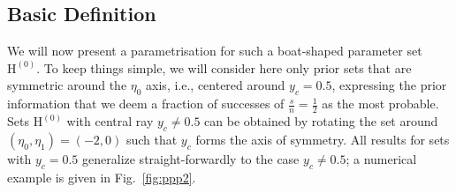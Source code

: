 \documentclass[runningheads,a4paper]{llncs}
\newcommand{\uz}{^{(0)}} %
\def\EZ{\mathrm{H}\uz}
\begin{document}
\subsection{Basic Definition}
\label{sec:basicdefboat}

We will now present a parametrisation for such a boat-shaped parameter set $\EZ$.
To keep things simple, we will consider here only prior sets
that are symmetric around the $\eta_0$ axis, i.e., centered around $y_c = 0.5$,
expressing the prior information that we deem a fraction of successes of $\frac{s}{n} = \frac{1}{2}$ as the most probable.
Sets $\EZ$ with central ray $y_c \neq 0.5$ can be obtained
by rotating the set around $(\eta_0, \eta_1) = (-2,0)$ such that $y_c$ forms the axis of symmetry.
All results for sets with $y_c = 0.5$ generalize straight-forwardly to the case $y_c \neq 0.5$;
a numerical example is given in Fig.~\ref{fig:ppp2}.
\end{document}
